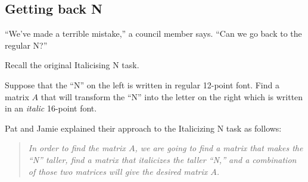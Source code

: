 \begin{iola}
\section*{Getting back N}
\question

``We've made a terrible mistake,'' a council member says. ``Can we go back to the regular N?''


Recall the original Italicising N task.

\begin{minipage}{.5\textwidth}
\hfill
{}\hfill
\end{minipage}
\begin{minipage}{.5\textwidth}

Suppose that the ``N'' on the left is written in regular 12-point font.  Find a matrix $A$ that will transform
	the ``N'' into the letter on the right which is written in an \emph{italic} 16-point font.
\end{minipage}

Pat and Jamie explained their approach to the Italicizing N task as follows:
\begin{quote}\itshape
	In order to find the matrix $A$, we are going to find a matrix that makes the ``N'' taller,
	find a matrix that italicizes the taller ``N,'' and a combination of those two matrices
	will give the desired matrix $A$.
\end{quote}



\end{iola}
